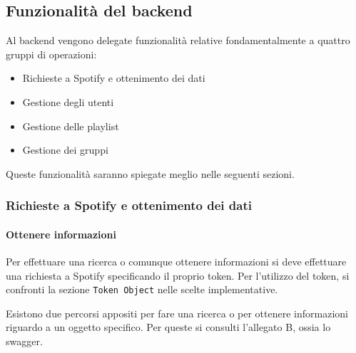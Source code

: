 \subsection{Funzionalità del backend}
Al backend vengono delegate funzionalità relative fondamentalmente a quattro gruppi di operazioni:\begin{itemize}
    \item Richieste a Spotify e ottenimento dei dati
    \item Gestione degli utenti
    \item Gestione delle playlist
    \item Gestione dei gruppi
\end{itemize}
Queste funzionalità saranno spiegate meglio nelle seguenti sezioni.
\subsubsection{Richieste a Spotify e ottenimento dei dati}
\paragraph{Ottenere informazioni}
Per effettuare una ricerca o comunque ottenere informazioni si deve effettuare una richiesta a Spotify specificando il proprio token. Per l'utilizzo del token, si confronti la sezione \verb|Token Object| nelle scelte implementative.

Esistono due percorsi appositi per fare una ricerca o per ottenere informazioni riguardo a un oggetto specifico. Per queste si consulti l'allegato B, ossia lo swagger.
\newpage